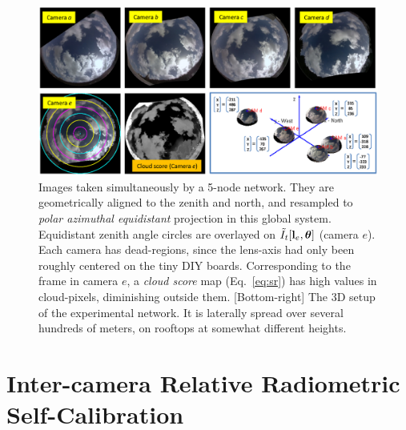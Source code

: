 \documentclass[runningheads]{llncs}
\begin{document}
\begin{figure}[t!]
\begin{center}
   \includegraphics[width=1\linewidth]{figures/scene_d.eps}
\end{center}
   \vspace{-1.2cm}
   \caption{Images taken simultaneously by a 5-node network. They are geometrically aligned to the zenith and north, and resampled to {\em polar azimuthal equidistant} projection in this global system. Equidistant zenith angle circles are overlayed on $\tilde I_t[{\bf l}_e,{\bm \theta}]$ (camera $e$). Each camera has dead-regions, since the lens-axis had only been roughly centered on the tiny DIY boards.
   Corresponding to the frame in camera $e$, a {\em cloud score} map (Eq.~\ref{eq:sr}) has high values in cloud-pixels, diminishing outside them. [Bottom-right] The 3D setup of the experimental network. It is laterally spread over several hundreds of meters, on rooftops at somewhat different heights.}
\label{fig:photomotion}
\end{figure}



\section{Inter-camera Relative Radiometric Self-Calibration}
\label{sec:mutiradio}

%
%
\end{document}
